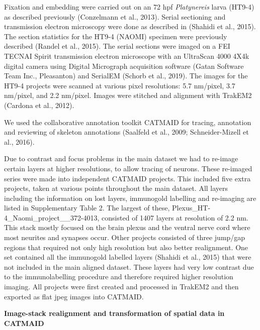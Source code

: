 \documentclass[
  11pt,
]{article}
\begin{document}
Fixation and embedding were carried out on an 72 hpf \emph{Platynereis}
larva (HT9-4) as described previously (Conzelmann et al., 2013). Serial
sectioning and transmission electron microscopy were done as described
in (Shahidi et al., 2015). The section statistics for the HT9-4 (NAOMI)
specimen were previously described (Randel et al., 2015). The serial
sections were imaged on a FEI TECNAI Spirit transmission electron
microscope with an UltraScan 4000 4X4k digital camera using Digital
Micrograph acquisition software (Gatan Software Team Inc., Pleasanton)
and SerialEM (Schorb et al., 2019). The images for the HT9-4 projects
were scanned at various pixel resolutions: 5.7 nm/pixel, 3.7 nm/pixel,
and 2.2 nm/pixel. Images were stitched and alignment with TrakEM2
(Cardona et al., 2012).

We used the collaborative annotation toolkit CATMAID for tracing,
annotation and reviewing of skeleton annotations (Saalfeld et al., 2009;
Schneider-Mizell et al., 2016).

Due to contrast and focus problems in the main dataset we had to
re-image certain layers at higher resolutions, to allow tracing of
neurons. These re-imaged series were made into independent CATMAID
projects. This included five extra projects, taken at various points
throughout the main dataset. All layers including the information on
lost layers, immunogold labelling and re-imaging are listed in
Supplementary Table 2. The largest of these,
Plexus\_HT-4\_Naomi\_project\_\_372-4013, consisted of 1407 layers at
resolution of 2.2 nm. This stack mostly focused on the brain plexus and
the ventral nerve cord where most neurites and synapses occur. Other
projects consisted of three jump/gap regions that required not only high
resolution but also better realignment. One set contained all the
immunogold labelled layers (Shahidi et al., 2015) that were not included
in the main aligned dataset. These layers had very low contrast due to
the immunolabelling procedure and therefore required higher resolution
imaging. All projects were first created and processed in TrakEM2 and
then exported as flat jpeg images into CATMAID.

\textbf{Image-stack realignment and transformation of spatial data in
CATMAID}
\end{document}
